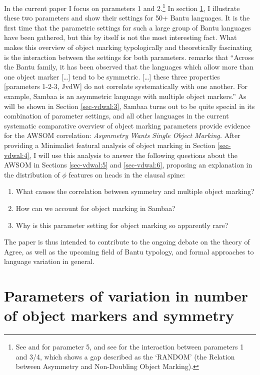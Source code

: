 \documentclass[output=paper
,modfonts
,nonflat]{langsci/langscibook}
\begin{document}
In the current paper I focus on parameters 1 and 2.\footnote{See \citet{Beaudoin-Lietz_et_al2004} and \citet{Marlo2015} for parameter 5, and see \citet{Van_der_Wal2017b} for the interaction between parameters 1 and 3/4, which shows a gap described as the ‘RANDOM’ (the Relation between Asymmetry and Non-Doubling Object Marking).} 
In section \ref{sec-vdwal:2}, I illustrate these two parameters and show their settings for 50+ Bantu languages. It is the first time that the parametric settings for such a large group of Bantu languages have been gathered, but this by itself is not the most interesting fact. What makes this overview of object marking typologically and theoretically fascinating is the interaction between the settings for both parameters. \citet[78]{Riedel2009} remarks that “Across the Bantu family, it has been observed that the languages which allow more than one object marker […] tend to be symmetric. […] these three properties [parameters 1-2-3, JvdW] do not correlate systematically with one another. For example, Sambaa is an asymmetric language with multiple object markers.” As will be shown in Section \ref{sec-vdwal:3}, Sambaa turns out to be quite special in its combination of parameter settings, and all other languages in the current systematic comparative overview of object marking parameters provide evidence for the AWSOM correlation: \textit{Asymmetry Wants Single Object Marking.} After providing a Minimalist featural analysis of object marking in Section \ref{sec-vdwal:4}, I will use this analysis to answer the following questions about the AWSOM in Sections \ref{sec-vdwal:5} and \ref{sec-vdwal:6}, proposing an explanation in the distribution of $\phi$ features on heads in the clausal spine:
\begin{enumerate}
\item[1.]What causes the correlation between symmetry and multiple object marking?
\item[2.]How can we account for object marking in Sambaa?
\item[3.]Why is this parameter setting for object marking so apparently rare?
\end{enumerate}
The paper is thus intended to contribute to the ongoing debate on the theory of Agree, as well as the upcoming field of Bantu typology, and formal approaches to language variation in general.

\section{Parameters of variation in number of object markers and symmetry} \label{sec-vdwal:2}
\end{document}
